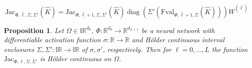 \documentclass[10pt,a4paper]{amsart}
\newtheorem{proposition}{Proposition}
\begin{document}
		\begin{equation}\label{eq: algo jac recursion}
			\mathrm{Jac}_{\Phi,\hat{\ell}, \Sigma, \Sigma'}(\hat{K}) = 
			\mathrm{Jac}_{\Phi,\hat{\ell}+1, \Sigma, \Sigma'}(\hat{K})  \operatorname{diag}(\Sigma'(\mathrm{Fval}_{\Phi , \hat{\ell}+1,\Sigma}(\hat{K}))) W^{(\hat{\ell})}
		\end{equation}

	\begin{proposition}\label{prop: jac hölder}
		Let $\Omega \in \mathbb{IR}^{d_0}$, $\Phi : \mathbb{R}^{d_0} \to \mathbb{R}^{d_{L+1}}$ be a neural network with differentiable activation function $\sigma : \mathbb{R} \to \mathbb{R}$ and Hölder continuous interval enclosures $\Sigma,\Sigma':\mathbb{IR}\to \mathbb{IR}$ of $\sigma,\sigma'$, respectively. Then for $\ell=0,\dotsc,L$ the function $\mathrm{Jac}_{\Phi,\ell, \Sigma, \Sigma'}$ is Hölder continuous on $\Omega$.
	\end{proposition}
\end{document}
